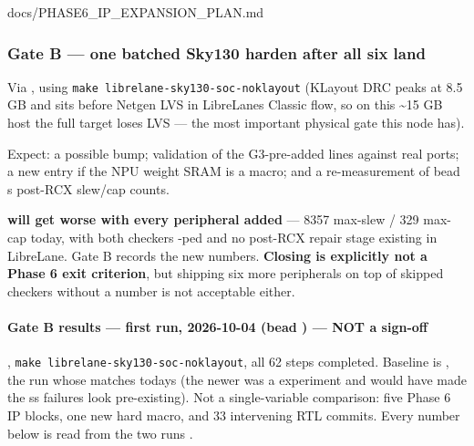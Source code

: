 \begin{relocated}{docs/PHASE6_IP_EXPANSION_PLAN.md}
\subsubsection{Gate B --- one batched Sky130 harden after all six land}\label{ds:ch:phase6-ip-expansion-plan:gate-b-one-batched-sky130-harden-after-all-six-land}

Via , using
\texttt{make\ librelane-\allowbreak{}sky130-\allowbreak{}soc-\allowbreak{}noklayout}
(KLayout DRC peaks at 8.5 GB and sits before Netgen LVS in
LibreLane\textquotesingle s Classic flow, so on this \textasciitilde15
GB host the full target loses LVS --- the most important physical gate
this node has).

Expect: a possible  bump; validation of the G3-pre-added
 lines against real ports; a new
 entry if the NPU weight SRAM is a macro; and
a re-measurement of bead \textquotesingle s post-RCX slew/cap
counts.

\warn{} \textbf{ will get worse with every peripheral added}
--- 8357 max-slew / 329 max-cap today, with both checkers
-ped and no post-RCX repair stage existing in LibreLane.
Gate B records the new numbers. \textbf{Closing  is
explicitly not a Phase 6 exit criterion}, but shipping six more
peripherals on top of skipped checkers without a number is not
acceptable either.

\paragraph{\texorpdfstring{Gate B results --- first run, 2026-10-04
(bead ) --- \warn{} NOT a
sign-off}{Gate B results --- first run, 2026-10-04 (bead ) ---  NOT a sign-off}}\label{ds:ch:phase6-ip-expansion-plan:gate-b-results-first-run-2026-10-04-bead-f7vs15-warning-not-a-sign-off}

,
\texttt{make\ librelane-\allowbreak{}sky130-\allowbreak{}soc-\allowbreak{}noklayout},
all 62 steps completed. Baseline is
\textbf{}, the run whose
 matches today\textquotesingle s 
(the newer  was a
 experiment and would have made
the ss failures look pre-existing). Not a single-variable comparison:
five Phase 6 IP blocks, one new hard macro, and 33 intervening RTL
commits. Every number below is read from the two runs\textquotesingle{}
.


\end{relocated}
